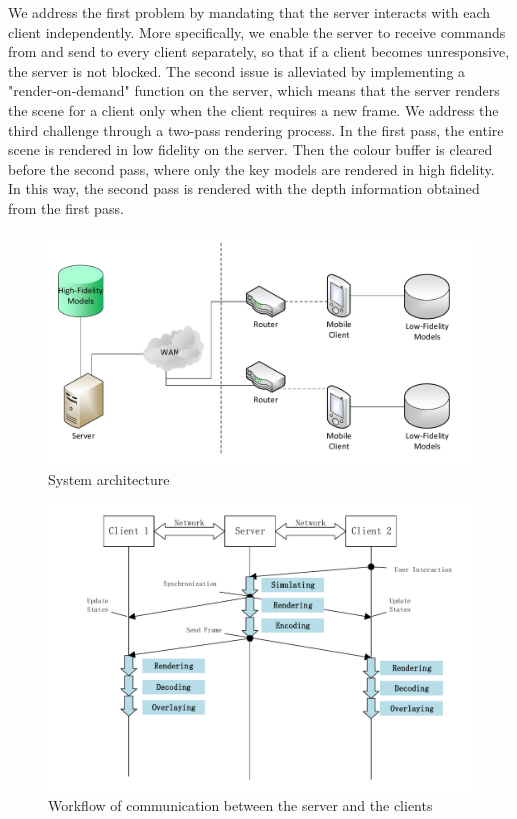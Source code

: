 We address the first problem by mandating that the server interacts with each client independently. More specifically, we enable the server to receive commands from and send to every client separately, so that if a client becomes unresponsive, the server is not blocked.
The second issue is alleviated by implementing a "render-on-demand" function on the server, which means that the server renders the scene for a client only when the client requires a new frame.
We address the third challenge through a two-pass rendering process. In the first pass, the entire scene is rendered in low fidelity on the server. Then the colour buffer is cleared before the second pass, where only the key models are rendered in high fidelity. In this way, the second pass is rendered with the depth information obtained from the first pass.

\begin{figure}[!htbp]
	\includegraphics[width=\textwidth]{figures/architecture.pdf}
	\caption{System architecture}
	\label{fig:architecture}
\end{figure}

\begin{figure}[!htbp]
	\includegraphics[width=\textwidth]{figures/sequence_workflow.pdf}
	\caption{Workflow of communication between the server and the clients}
	\label{fig:swf}
\end{figure}


